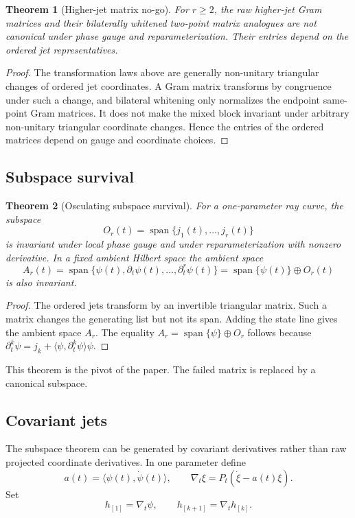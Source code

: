 \documentclass[11pt]{amsart}
\newtheorem{theorem}{Theorem}[section]
\newcommand{\Span}{\operatorname{span}}
\begin{document}
\begin{theorem}[Higher-jet matrix no-go]
For \(r\ge2\), the raw higher-jet Gram matrices and their bilaterally whitened
two-point matrix analogues are not canonical under phase gauge and
reparameterization. Their entries depend on the ordered jet representatives.
\end{theorem}

\begin{proof}
The transformation laws above are generally non-unitary triangular changes of
ordered jet coordinates. A Gram matrix transforms by congruence under such a
change, and bilateral whitening only normalizes the endpoint same-point Gram
matrices. It does not make the mixed block invariant under arbitrary non-unitary
triangular coordinate changes. Hence the entries of the ordered matrices depend
on gauge and coordinate choices.
\end{proof}

\subsection{Subspace survival}

\begin{theorem}[Osculating subspace survival]
For a one-parameter ray curve, the subspace
\[
        O_r(t)=\Span\{j_1(t),\ldots,j_r(t)\}
\]
is invariant under local phase gauge and under reparameterization with nonzero
derivative. In a fixed ambient Hilbert space the ambient space
\[
        A_r(t)=\Span\{\psi(t),\partial_t\psi(t),\ldots,\partial_t^r\psi(t)\}
              =\Span\{\psi(t)\}\oplus O_r(t)
\]
is also invariant.
\end{theorem}

\begin{proof}
The ordered jets transform by an invertible triangular matrix. Such a matrix
changes the generating list but not its span. Adding the state line gives the
ambient space \(A_r\). The equality
\(A_r=\Span\{\psi\}\oplus O_r\) follows because
\(\partial_t^k\psi=j_k+\langle\psi,\partial_t^k\psi\rangle\psi\).
\end{proof}

This theorem is the pivot of the paper. The failed matrix is replaced by a
canonical subspace.

\subsection{Covariant jets}

The subspace theorem can be generated by covariant derivatives rather than raw
projected coordinate derivatives. In one parameter define
\[
        a(t)=\langle\psi(t),\dot\psi(t)\rangle,\qquad
        \nabla_t\xi=P_t(\dot\xi-a(t)\xi).
\]
Set
\[
        h_{[1]}=\nabla_t\psi,\qquad h_{[k+1]}=\nabla_t h_{[k]}.
\]
\end{document}
